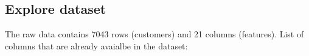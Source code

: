 \documentclass[12pt]{article}
\begin{document}
\subsection{Explore dataset}
The raw data contains 7043 rows (customers) and 21 columns (features).
List of columns that are already avaialbe in the dataset:
\end{document}
